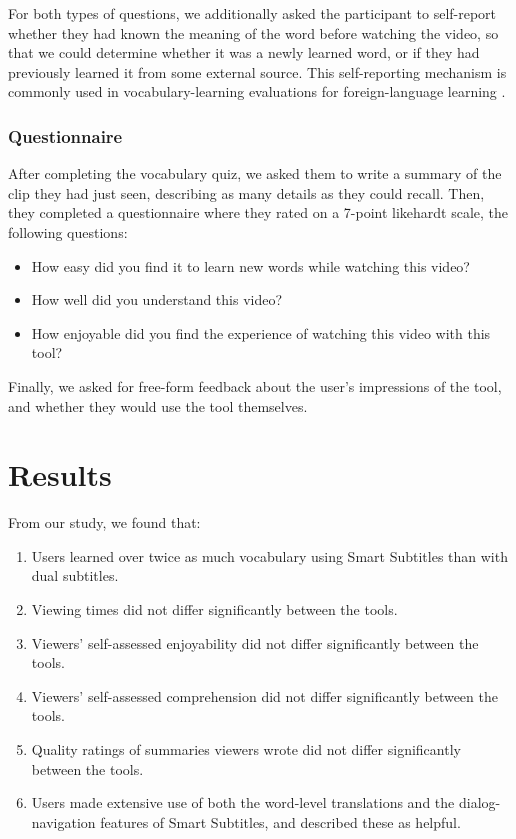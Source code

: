 \documentclass{sigchi}
\begin{document}
For both types of questions, we additionally asked the participant to self-report whether they had known the meaning of the word before watching the video, so that we could determine whether it was a newly learned word, or if they had previously learned it from some external source. This self-reporting mechanism is commonly used in vocabulary-learning evaluations for foreign-language learning \cite{wesche1996assessing}.

\subsubsection{Questionnaire}

After completing the vocabulary quiz, we asked them to write a summary of the clip they had
just seen, describing as many details as they could recall. Then, they completed
a questionnaire where they rated on a 7-point likehardt scale, the following questions:

\begin{itemize}[noitemsep]
\item How easy did you find it to learn new words while watching this video?
\item How well did you understand this video?
\item How enjoyable did you find the experience of watching this video with this tool?
\end{itemize}

Finally, we asked for free-form feedback about the user's impressions of the tool, and whether they would use the tool themselves.

\section{Results}

From our study, we found that:

\begin{enumerate}[noitemsep]
\item Users learned over twice as much vocabulary using Smart Subtitles than with dual subtitles.
\item Viewing times did not differ significantly between the tools.
\item Viewers' self-assessed enjoyability did not differ significantly between the tools.
\item Viewers' self-assessed comprehension did not differ significantly between the tools.
\item Quality ratings of summaries viewers wrote did not differ significantly
between the tools.
\item Users made extensive use of both the word-level translations and the dialog-navigation features of Smart Subtitles, and described these as helpful.
\end{enumerate}
\end{document}
